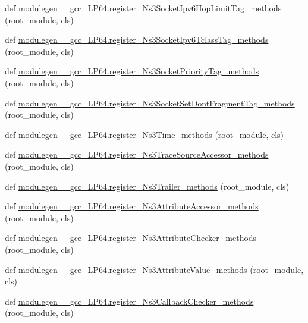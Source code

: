 \begin{DoxyCompactItemize}
\item 
def \hyperlink{namespacemodulegen____gcc__LP64_a0610606c87081cec911e5c92c72969c2}{modulegen\+\_\+\+\_\+gcc\+\_\+\+L\+P64.\+register\+\_\+\+Ns3\+Socket\+Ipv6\+Hop\+Limit\+Tag\+\_\+methods} (root\+\_\+module, cls)
\item 
def \hyperlink{namespacemodulegen____gcc__LP64_a9183939b87f05c0cc4de3320a3fbb56b}{modulegen\+\_\+\+\_\+gcc\+\_\+\+L\+P64.\+register\+\_\+\+Ns3\+Socket\+Ipv6\+Tclass\+Tag\+\_\+methods} (root\+\_\+module, cls)
\item 
def \hyperlink{namespacemodulegen____gcc__LP64_a1e1a196158ec884ace33d88f68d667b0}{modulegen\+\_\+\+\_\+gcc\+\_\+\+L\+P64.\+register\+\_\+\+Ns3\+Socket\+Priority\+Tag\+\_\+methods} (root\+\_\+module, cls)
\item 
def \hyperlink{namespacemodulegen____gcc__LP64_a9e7921708babb536bc0caaf352c51c29}{modulegen\+\_\+\+\_\+gcc\+\_\+\+L\+P64.\+register\+\_\+\+Ns3\+Socket\+Set\+Dont\+Fragment\+Tag\+\_\+methods} (root\+\_\+module, cls)
\item 
def \hyperlink{namespacemodulegen____gcc__LP64_ade0bc7fc2ce1f975c0f8f367acfc957c}{modulegen\+\_\+\+\_\+gcc\+\_\+\+L\+P64.\+register\+\_\+\+Ns3\+Time\+\_\+methods} (root\+\_\+module, cls)
\item 
def \hyperlink{namespacemodulegen____gcc__LP64_abd8204bf10f1a73956889b2b56b0c2d3}{modulegen\+\_\+\+\_\+gcc\+\_\+\+L\+P64.\+register\+\_\+\+Ns3\+Trace\+Source\+Accessor\+\_\+methods} (root\+\_\+module, cls)
\item 
def \hyperlink{namespacemodulegen____gcc__LP64_a79f6f84947747209adf07fee76a18188}{modulegen\+\_\+\+\_\+gcc\+\_\+\+L\+P64.\+register\+\_\+\+Ns3\+Trailer\+\_\+methods} (root\+\_\+module, cls)
\item 
def \hyperlink{namespacemodulegen____gcc__LP64_a88b38d1f62a9078cdbfc0f0d77a01866}{modulegen\+\_\+\+\_\+gcc\+\_\+\+L\+P64.\+register\+\_\+\+Ns3\+Attribute\+Accessor\+\_\+methods} (root\+\_\+module, cls)
\item 
def \hyperlink{namespacemodulegen____gcc__LP64_a7a7d7cb7b6a065a93209b09c08d1c096}{modulegen\+\_\+\+\_\+gcc\+\_\+\+L\+P64.\+register\+\_\+\+Ns3\+Attribute\+Checker\+\_\+methods} (root\+\_\+module, cls)
\item 
def \hyperlink{namespacemodulegen____gcc__LP64_a91d88e3bac410892f68a8f1bfd117d79}{modulegen\+\_\+\+\_\+gcc\+\_\+\+L\+P64.\+register\+\_\+\+Ns3\+Attribute\+Value\+\_\+methods} (root\+\_\+module, cls)
\item 
def \hyperlink{namespacemodulegen____gcc__LP64_a1ef896a5bde844de40d219e98ceb0cee}{modulegen\+\_\+\+\_\+gcc\+\_\+\+L\+P64.\+register\+\_\+\+Ns3\+Callback\+Checker\+\_\+methods} (root\+\_\+module, cls)

\end{DoxyCompactItemize}
